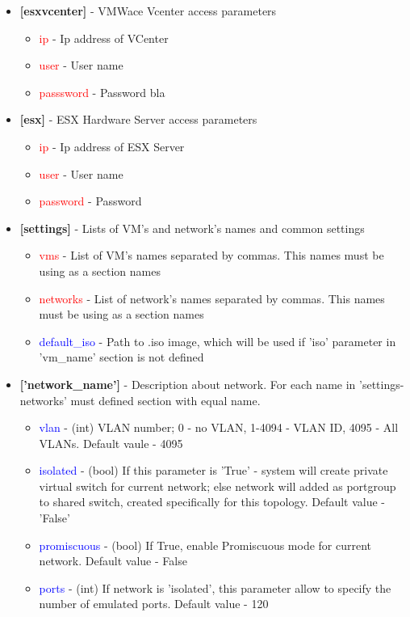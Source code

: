 \documentclass[a4paper,11pt]{article}
\begin{document}
\begin{Large}
\begin{itemize}

\item \textbf{[esxvcenter]} - VMWace Vcenter access parameters
\begin{itemize}
\item \large \textcolor{red}{ip} - Ip address of VCenter
\item \textcolor{red}{user} - User name
\item \textcolor{red}{passsword} - Password bla
\end{itemize}

\item \textbf{[esx]} - ESX Hardware Server access parameters
\begin{itemize}
\item \large \textcolor{red}{ip} - Ip address of ESX Server
\item \textcolor{red}{user} - User name
\item \textcolor{red}{password} - Password
\end{itemize}

\item \textbf{[settings]} - Lists of VM's and network's names and common settings
\begin{itemize}
\item \large \textcolor{red}{vms} - List of VM's names separated by commas. This names must be using as a section names
\item \textcolor{red}{networks} - List of network's names separated by commas. This names must be using as a section names
\item \textcolor{blue}{default\_iso} - Path to .iso image, which will be used if 'iso' parameter in 'vm\_name' section is not defined
\end{itemize}

\item \textbf{['network\_name']} - Description about network. For each name in 'settings-networks' must defined section with equal name.
\begin{itemize}
\item \large \textcolor{blue}{vlan} - (int) VLAN number; 0 - no VLAN, 1-4094 - VLAN ID, 4095 - All VLANs. Default vaule - 4095
\item \textcolor{blue}{isolated} - (bool) If this parameter is 'True' - system will create private virtual switch for current network; else network will added as portgroup to shared switch, created specifically for this topology. Default value - 'False'
\item \textcolor{blue}{promiscuous} - (bool) If True, enable Promiscuous mode for current network. Default value - False
\item \textcolor{blue}{ports} - (int) If network is 'isolated', this parameter allow to specify the number of emulated ports. Default value - 120

\end{itemize}



\end{itemize}
\end{Large}
\end{document}
